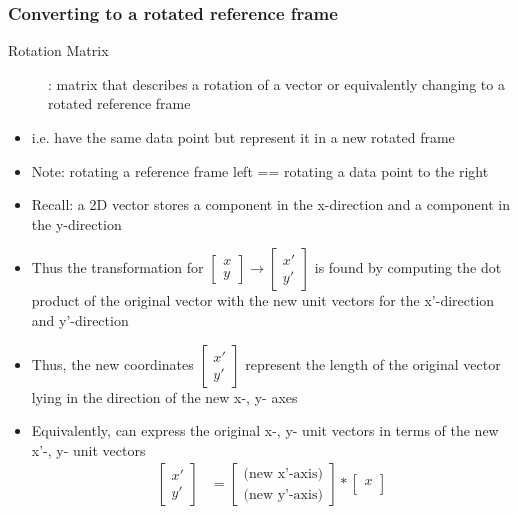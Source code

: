 \documentclass[letterpaper,12pt]{article}
\newcommand{\lra}{\ensuremath{\longrightarrow{}}}
\begin{document}
\subsubsection{Converting to a rotated reference frame}
\begin{description}
 \item[Rotation Matrix]: matrix that describes a rotation of a vector or equivalently changing to a rotated reference frame
\end{description}
\begin{itemize}
 \item i.e. have the same data point but represent it in a new rotated frame
 \item Note: rotating a reference frame left == rotating a data point to the right
 \item Recall: a 2D vector stores a component in the x-direction and a component in the y-direction
 \item Thus the transformation for $\begin{bmatrix}
         x \\
         y
        \end{bmatrix}
        \lra
        \begin{bmatrix}
         x' \\
         y'
        \end{bmatrix}$
       is found by computing the dot product of the original vector with the new unit vectors for the x'-direction and y'-direction
 \item Thus, the new coordinates $\begin{bmatrix}
         x' \\
         y'
        \end{bmatrix}$
       represent the length of the original vector lying in the direction of the new x-, y- axes
 \item Equivalently, can express the original x-, y- unit vectors in terms of the new x'-, y- unit vectors
       \begin{align}
        \begin{bmatrix}
         x' \\
         y'
        \end{bmatrix}
         & =
        \begin{bmatrix}
         \text{(new x'-axis)} \\
         \text{(new y'-axis)}
        \end{bmatrix}
        *\begin{bmatrix}
         x \\

\end{bmatrix}
\end{align}
\end{itemize}
\end{document}
